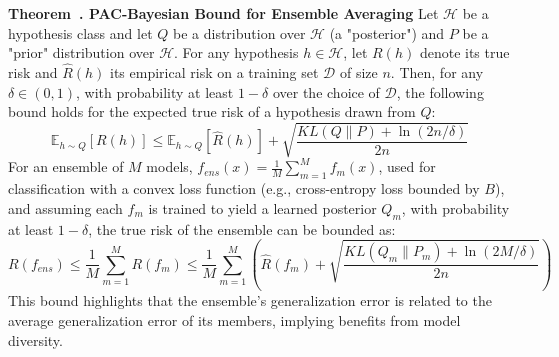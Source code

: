 \documentclass[journal]{IEEEtran}
\newcounter{theorem}
\newenvironment{theorem}[1][]{\refstepcounter{theorem}\par\medskip
   \noindent \textbf{Theorem~\thetheorem. #1} \rmfamily}{\medskip}
\begin{document}
\begin{theorem}[PAC-Bayesian Bound for Ensemble Averaging]
\label{thm:pac_bayes_app}
Let $\mathcal{H}$ be a hypothesis class and let $Q$ be a distribution over $\mathcal{H}$ (a "posterior") and $P$ be a "prior" distribution over $\mathcal{H}$. For any hypothesis $h \in \mathcal{H}$, let $R(h)$ denote its true risk and $\hat{R}(h)$ its empirical risk on a training set $\mathcal{D}$ of size $n$. Then, for any $\delta \in (0,1)$, with probability at least $1-\delta$ over the choice of $\mathcal{D}$, the following bound holds for the expected true risk of a hypothesis drawn from $Q$:
\begin{equation}
\mathbb{E}_{h \sim Q}[R(h)] \leq \mathbb{E}_{h \sim Q}[\hat{R}(h)] + \sqrt{\frac{KL(Q \| P) + \ln(2n/\delta)}{2n}}
\end{equation}
For an ensemble of $M$ models, $f_{ens}(x) = \frac{1}{M} \sum_{m=1}^M f_m(x)$, used for classification with a convex loss function (e.g., cross-entropy loss bounded by $B$), and assuming each $f_m$ is trained to yield a learned posterior $Q_m$, with probability at least $1-\delta$, the true risk of the ensemble can be bounded as:
\begin{equation}
R(f_{ens}) \leq \frac{1}{M} \sum_{m=1}^M R(f_m) \leq \frac{1}{M} \sum_{m=1}^M \left( \hat{R}(f_m) + \sqrt{\frac{KL(Q_m \| P_m) + \ln(2M/\delta)}{2n}} \right)
\end{equation}
This bound highlights that the ensemble's generalization error is related to the average generalization error of its members, implying benefits from model diversity.
\end{theorem}
\end{document}
